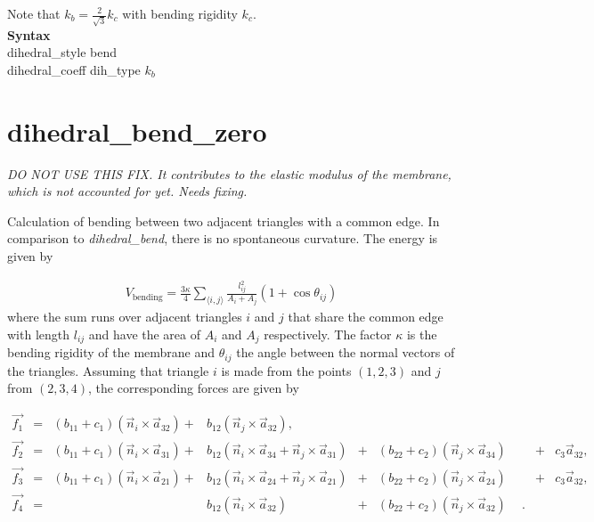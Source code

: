 Note that $k_b = \frac{2}{\sqrt{3}} k_c$ with bending rigidity $k_c$.\\

\textbf{Syntax}\\
dihedral\_style \quad bend \\
dihedral\_coeff \quad dih\_type $k_b$


\section{dihedral\_bend\_zero}

\emph{DO NOT USE THIS FIX. It contributes to the elastic modulus of the membrane, which is not accounted for yet. Needs fixing.}

Calculation of bending between two adjacent triangles with a common edge. In comparison to \emph{dihedral\_bend}, there is no spontaneous curvature. The energy is given by

\begin{align}
  V_\mathrm{bending} = \frac {3 \kappa}{4} \sum_{\langle i, j \rangle} \frac{l_{ij}^2}{A_i + A_j} \left(1 + \cos \theta_{ij} \right)
\end{align}
where the sum runs over adjacent triangles $i$ and $j$ that share the common edge with length $l_{ij}$ and have the area of $A_i$ and $A_j$ respectively. The factor $\kappa$ is the bending rigidity of the membrane and $\theta_{ij}$ the angle between the normal vectors of the triangles. Assuming that triangle $i$ is made from the points $(1, 2, 3)$ and $j$ from $(2, 3, 4)$, the corresponding forces are given by

\begin{align}
  \vec{f_1} &=& \left(b_{11} + c_1 \right) \left(\vec{n}_i \times \vec{a}_{32}\right) + &b_{12} \left(\vec{n}_j \times \vec{a}_{32}\right), \nonumber \\
  \vec{f_2} &=& \left(b_{11} + c_1 \right) \left(\vec{n}_i \times \vec{a}_{31}\right) + &b_{12} \left(\vec{n}_i \times \vec{a}_{34} + \vec{n}_j \times \vec{a}_{31}\right) &+& \left(b_{22} + c_2\right) \left(\vec{n}_j \times \vec{a}_{34} \right) &+ &c_3 \vec{a}_{32}, \nonumber \\
  \vec{f_3} &=& \left(b_{11} + c_1 \right) \left(\vec{n}_i \times \vec{a}_{21}\right) + &b_{12} \left(\vec{n}_i \times \vec{a}_{24} + \vec{n}_j \times \vec{a}_{21}\right) &+&\left(b_{22} + c_2\right) \left(\vec{n}_j \times \vec{a}_{24} \right) &+ &c_3 \vec{a}_{32}, \nonumber \\
  \vec{f_4} &=& &b_{12} \left(\vec{n}_i \times \vec{a}_{32}\right) &+ &\left(b_{22} + c_2\right) \left(\vec{n}_j \times \vec{a}_{32}\right) \phantom{+}. & & \label{eq: bend_zero_forces}
\end{align}


